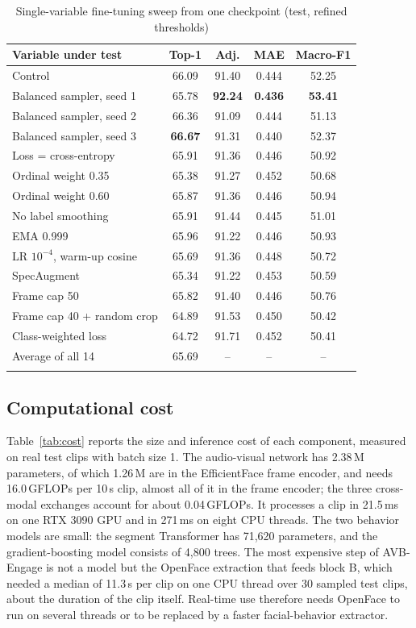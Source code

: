 \documentclass[pdflatex,iicol,sn-basic]{sn-jnl}
\newcommand{\ournet}{AVB-Engage}
\begin{document}
\begin{table}[t]
\caption{Single-variable fine-tuning sweep from one checkpoint (test, refined thresholds)}\label{tab:sweep}
\begin{tabular*}{\textwidth}{@{\extracolsep\fill}lcccc}
\toprule
Variable under test & Top-1 & Adj. & MAE & Macro-F1\\
\midrule
Control & 66.09 & 91.40 & 0.444 & 52.25\\
Balanced sampler, seed 1 & 65.78 & \textbf{92.24} & \textbf{0.436} & \textbf{53.41}\\
Balanced sampler, seed 2 & 66.36 & 91.09 & 0.444 & 51.13\\
Balanced sampler, seed 3 & \textbf{66.67} & 91.31 & 0.440 & 52.37\\
Loss = cross-entropy & 65.91 & 91.36 & 0.446 & 50.92\\
Ordinal weight 0.35 & 65.38 & 91.27 & 0.452 & 50.68\\
Ordinal weight 0.60 & 65.87 & 91.36 & 0.446 & 50.94\\
No label smoothing & 65.91 & 91.44 & 0.445 & 51.01\\
EMA 0.999 & 65.96 & 91.22 & 0.446 & 50.93\\
LR $10^{-4}$, warm-up cosine & 65.69 & 91.36 & 0.448 & 50.72\\
SpecAugment \citep{park2019specaugment} & 65.34 & 91.22 & 0.453 & 50.59\\
Frame cap 50 & 65.82 & 91.40 & 0.446 & 50.76\\
Frame cap 40 + random crop & 64.89 & 91.53 & 0.450 & 50.42\\
Class-weighted loss & 64.72 & 91.71 & 0.452 & 50.41\\
\midrule
Average of all 14 & 65.69 & -- & -- & --\\
\botrule
\end{tabular*}
\end{table}

\subsection{Computational cost}\label{sec:res_cost}

Table~\ref{tab:cost} reports the size and inference cost of each component, measured on real test clips with batch size 1. The audio-visual network has 2.38\,M parameters, of which 1.26\,M are in the EfficientFace frame encoder, and needs 16.0\,GFLOPs per 10\,s clip, almost all of it in the frame encoder; the three cross-modal exchanges account for about 0.04\,GFLOPs. It processes a clip in 21.5\,ms on one RTX 3090 GPU and in 271\,ms on eight CPU threads. The two behavior models are small: the segment Transformer has 71,620 parameters, and the gradient-boosting model consists of 4,800 trees. The most expensive step of \ournet{} is not a model but the OpenFace extraction that feeds block B, which needed a median of 11.3\,s per clip on one CPU thread over 30 sampled test clips, about the duration of the clip itself. Real-time use therefore needs OpenFace to run on several threads or to be replaced by a faster facial-behavior extractor.
\end{document}
